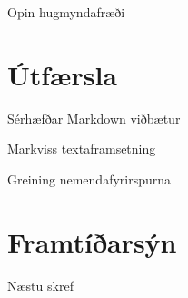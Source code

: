 \documentclass[hi-blar]{beamer}
\begin{document}
\begin{frame}{Opin hugmyndafræði}
  
\end{frame}

\section{Útfærsla}

\begin{frame}{Sérhæfðar Markdown viðbætur}

\end{frame}

\begin{frame}{Markviss textaframsetning}
  
\end{frame}

\begin{frame}{Greining nemendafyrirspurna}
  
\end{frame}

\section{Framtíðarsýn}

\begin{frame}{Næstu skref}
  
\end{frame}
\end{document}
